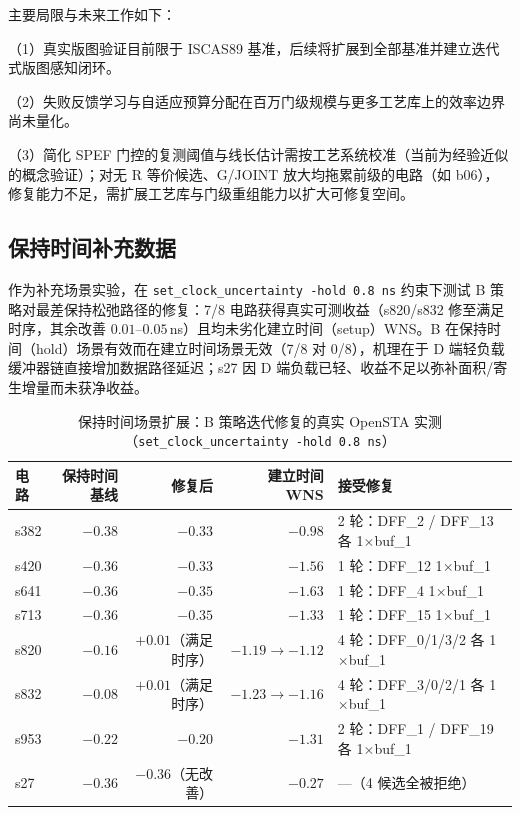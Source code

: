 \documentclass[journal]{IEEEtran}
\begin{document}
主要局限与未来工作如下：

（1）真实版图验证目前限于 ISCAS89 基准，后续将扩展到全部基准并建立迭代式版图感知闭环。

（2）失败反馈学习与自适应预算分配在百万门级规模与更多工艺库上的效率边界尚未量化。

（3）简化 SPEF 门控的复测阈值与线长估计需按工艺系统校准（当前为经验近似的概念验证）；对无 R 等价候选、G/JOINT 放大均拖累前级的电路（如 b06），修复能力不足，需扩展工艺库与门级重组能力以扩大可修复空间。

\begin{appendices}
\section{保持时间补充数据}\label{app:hold}

作为补充场景实验，在 \texttt{set\_clock\_uncertainty -hold 0.8\,ns} 约束下测试 B 策略对最差保持松弛路径的修复：7/8 电路获得真实可测收益（s820/s832 修至满足时序，其余改善 $0.01$--$0.05\,$ns）且均未劣化建立时间（setup）WNS。B 在保持时间（hold）场景有效而在建立时间场景无效（7/8 对 0/8），机理在于 D 端轻负载缓冲器链直接增加数据路径延迟；s27 因 D 端负载已轻、收益不足以弥补面积/寄生增量而未获净收益。

\begin{table}[!htbp]
\centering
\caption{保持时间场景扩展：B 策略迭代修复的真实 OpenSTA 实测（\texttt{set\_clock\_uncertainty -hold 0.8\,ns}）}
\label{tab:hold}
\scriptsize
\setlength{\tabcolsep}{2pt}
\begin{tabular}{lrrrp{2.0cm}}
\toprule
\textbf{电路} & \textbf{保持时间基线} & \textbf{修复后} & \textbf{建立时间 WNS} & \textbf{接受修复} \\
\midrule
s382 & $-0.38$ & $-0.33$ & $-0.98$ & 2 轮：DFF\_2 / DFF\_13 各 1$\times$buf\_1 \\
s420 & $-0.36$ & $-0.33$ & $-1.56$ & 1 轮：DFF\_12 1$\times$buf\_1 \\
s641 & $-0.36$ & $-0.35$ & $-1.63$ & 1 轮：DFF\_4 1$\times$buf\_1 \\
s713 & $-0.36$ & $-0.35$ & $-1.33$ & 1 轮：DFF\_15 1$\times$buf\_1 \\
s820 & $-0.16$ & $+0.01$（满足时序） & $-1.19\rightarrow -1.12$ & 4 轮：DFF\_0/1/3/2 各 1$\times$buf\_1 \\
s832 & $-0.08$ & $+0.01$（满足时序） & $-1.23\rightarrow -1.16$ & 4 轮：DFF\_3/0/2/1 各 1$\times$buf\_1 \\
s953 & $-0.22$ & $-0.20$ & $-1.31$ & 2 轮：DFF\_1 / DFF\_19 各 1$\times$buf\_1 \\
s27 & $-0.36$ & $-0.36$（无改善） & $-0.27$ & ---（4 候选全被拒绝） \\
\bottomrule
\end{tabular}
\end{table}

\end{appendices}
\end{document}
